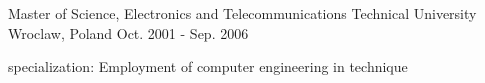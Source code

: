 

\begin{cventries}

  \cventry
    {Master of Science, Electronics and Telecommunications} %
    {Technical University} %
    {Wroclaw, Poland} %
    {Oct. 2001 - Sep. 2006} %
    {
      \begin{cvitems} %
        \item {specialization: Employment of computer engineering in technique}
      \end{cvitems}
    }

\end{cventries}
